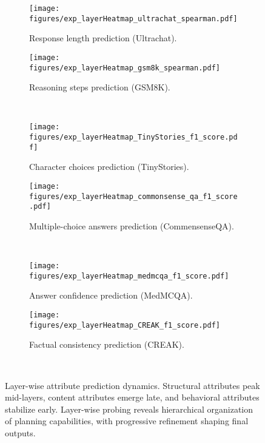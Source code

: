 \begin{figure*}[tb!] 
   \centering
   \begin{subfigure}[b]{0.48\linewidth}
       \centering
       \texttt{[image: figures/exp\_layerHeatmap\_ultrachat\_spearman.pdf]}
       \caption{Response length prediction (Ultrachat).}
       \label{fig:exp_response_length_layerwise}
   \end{subfigure}
   \hfill  %
   \begin{subfigure}[b]{0.48\linewidth}
       \centering
       \texttt{[image: figures/exp\_layerHeatmap\_gsm8k\_spearman.pdf]}
       \caption{Reasoning steps prediction (GSM8K).}
       \label{fig:exp_reasoning_steps_layerwise}
   \end{subfigure}
   \\
   \begin{subfigure}[b]{0.48\linewidth}
       \centering
       \texttt{[image: figures/exp\_layerHeatmap\_TinyStories\_f1\_score.pdf]}
       \caption{Character choices prediction (TinyStories).}
       \label{fig:exp_character_choices_layerwise}
   \end{subfigure}
   \hfill  %
   \begin{subfigure}[b]{0.48\linewidth}
       \centering
       \texttt{[image: figures/exp\_layerHeatmap\_commonsense\_qa\_f1\_score.pdf]}
       \caption{Multiple-choice answers prediction (CommensenseQA).}
       \label{fig:exp_multiplechoice_answers_layerwise}
   \end{subfigure}
   \\
   \begin{subfigure}[b]{0.48\linewidth}
       \centering
       \texttt{[image: figures/exp\_layerHeatmap\_medmcqa\_f1\_score.pdf]}
       \caption{Answer confidence prediction (MedMCQA).}
       \label{fig:exp_answer_confidence_layerwise}
   \end{subfigure}
   \hfill  %
   \begin{subfigure}[b]{0.48\linewidth}
       \centering
       \texttt{[image: figures/exp\_layerHeatmap\_CREAK\_f1\_score.pdf]}
       \caption{Factual consistency prediction (CREAK).}
       \label{fig:exp_factual_consistency_layerwise}
   \end{subfigure}
   \\
   \vspace{-10pt}
   \caption{\label{fig:exp_layerwise} Layer-wise attribute prediction dynamics. Structural attributes peak mid-layers, content attributes emerge late, and behavioral attributes stabilize early. Layer-wise probing reveals hierarchical organization of planning capabilities, with progressive refinement shaping final outputs.}
\end{figure*}

